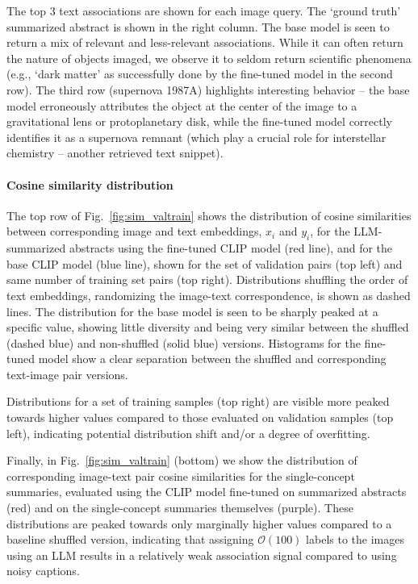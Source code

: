 \documentclass[10pt]{article} %
\begin{document}
The top 3 text associations are shown for each image query. The `ground truth' summarized abstract is shown in the right column. The base model is seen to return a mix of relevant and less-relevant associations. While it can often return the nature of objects imaged, we observe it to seldom return scientific phenomena (e.g., `dark matter' as successfully done by the fine-tuned model in the second row). The third row (supernova 1987A) highlights interesting behavior -- the base model erroneously attributes the object at the center of the image to a gravitational lens or protoplanetary disk, while the fine-tuned model correctly identifies it as a supernova remnant (which play a crucial role for interstellar chemistry -- another retrieved text snippet).

\paragraph*{Cosine similarity distribution}

The top row of Fig.~\ref{fig:sim_valtrain} shows the distribution of cosine similarities between corresponding image and text embeddings, $x_i$ and $y_i$, for the LLM-summarized abstracts using the fine-tuned CLIP model (red line), and for the base CLIP model (blue line), shown for the set of validation pairs (top left) and same number of training set pairs (top right). Distributions shuffling the order of text embeddings, randomizing the image-text correspondence, is shown as dashed lines. The distribution for the base model is seen to be sharply peaked at a specific value, showing little diversity and being very similar between the shuffled (dashed blue) and non-shuffled (solid blue) versions. Histograms for the fine-tuned model show a clear separation between the shuffled and corresponding text-image pair versions.

Distributions for a set of training samples (top right) are visible more peaked towards higher values compared to those evaluated on validation samples (top left), indicating potential distribution shift and/or a degree of overfitting.

Finally, in Fig.~\ref{fig:sim_valtrain} (bottom) we show the distribution of corresponding image-text pair cosine similarities for the single-concept summaries, evaluated using the CLIP model fine-tuned on summarized abstracts (red) and on the single-concept summaries themselves (purple). These distributions are peaked towards only marginally higher values compared to a baseline shuffled version, indicating that assigning $\mathcal O(100)$ labels to the images using an LLM results in a relatively weak association signal compared to using noisy captions.
\end{document}
